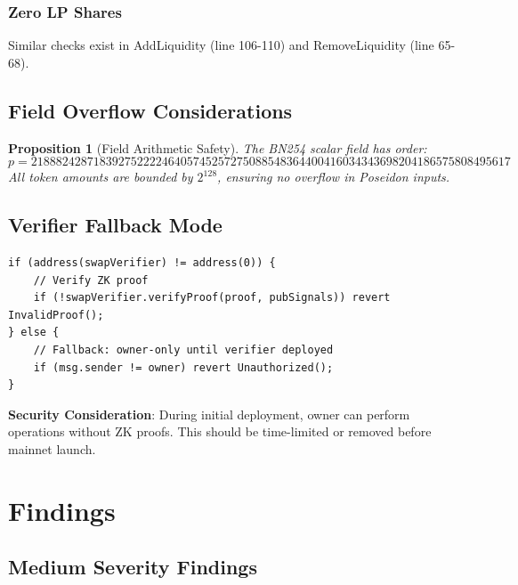 \documentclass[11pt,a4paper]{article}
\newtheorem{proposition}[theorem]{Proposition}
\begin{document}
\subsubsection{Zero LP Shares}

Similar checks exist in AddLiquidity (line 106-110) and RemoveLiquidity (line 65-68).

\subsection{Field Overflow Considerations}

\begin{proposition}[Field Arithmetic Safety]
The BN254 scalar field has order:
\begin{equation}
p = 21888242871839275222246405745257275088548364400416034343698204186575808495617
\end{equation}
All token amounts are bounded by $2^{128}$, ensuring no overflow in Poseidon inputs.
\end{proposition}

\subsection{Verifier Fallback Mode}

\begin{lstlisting}[style=solidity, caption={Verifier Fallback (ZkAMMv3.sol concept)}]
if (address(swapVerifier) != address(0)) {
    // Verify ZK proof
    if (!swapVerifier.verifyProof(proof, pubSignals)) revert InvalidProof();
} else {
    // Fallback: owner-only until verifier deployed
    if (msg.sender != owner) revert Unauthorized();
}
\end{lstlisting}

\textbf{Security Consideration}: During initial deployment, owner can perform operations without ZK proofs. This should be time-limited or removed before mainnet launch.

\section{Findings}

\subsection{Medium Severity Findings}
\end{document}
